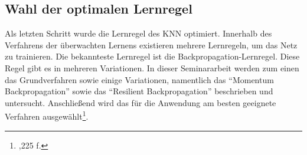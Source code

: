 \subsection{Wahl der optimalen Lernregel}
\label{subsection:Wahl der optimalen Lernregel}

Als letzten Schritt wurde die Lernregel des KNN optimiert. Innerhalb des Verfahrens der überwachten Lernens existieren mehrere Lernregeln, um das Netz zu trainieren. Die bekannteste Lernregel ist die Backpropagation-Lernregel. Diese Regel gibt es in mehreren Variationen. In dieser Seminararbeit werden zum einen das Grundverfahren sowie einige Variationen, namentlich das  "`Momentum Backpropagation"' sowie das "`Resilient Backpropagation"' beschrieben und untersucht. Anschließend wird das für die Anwendung am besten geeignete Verfahren ausgewählt\footnote{\Vgl{},225 f.}.

